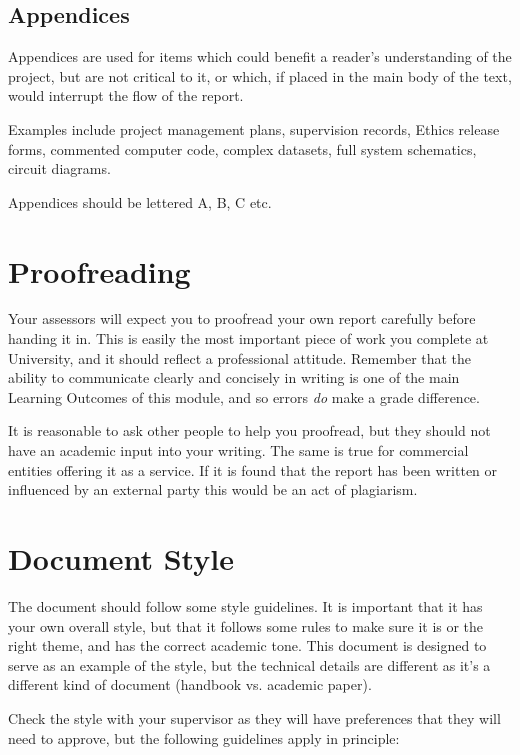 \subsection{Appendices}

Appendices are used for items which could benefit a reader’s understanding of the project, but are not critical to it, or which, if placed in the main body of the text, would interrupt the flow of the report.

Examples include project management plans, supervision records, Ethics release forms, commented computer code, complex datasets, full system schematics, circuit diagrams.

Appendices should be lettered A, B, C etc.


\section{Proofreading}

Your assessors will expect you to proofread your own report carefully before handing it in. This is easily the most important piece of work you complete at University, and it should reflect a professional attitude. Remember that the ability to communicate clearly and concisely in writing is one of the main Learning Outcomes of this module, and so errors \textit{do} make a grade difference. 

It is reasonable to ask other people to help you proofread, but they should not have an academic input into your writing. The same is true for commercial entities offering it as a service. If it is found that the report has been written or influenced by an external party this would be an act of plagiarism.

\section{Document Style}

The document should follow some style guidelines. It is important that it has your own overall style, but that it follows some rules to make sure it is or the right theme, and has the correct academic tone. This document is designed to serve as an example of the style, but the technical details are different as it's a different kind of document (handbook vs. academic paper). 

Check the style with your supervisor as they will have preferences that they will need to approve, but the following guidelines apply in principle:

